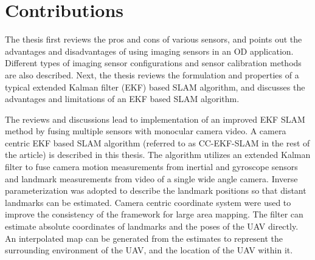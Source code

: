 \section{Contributions}\label{section:Contribution}
The thesis first reviews the pros and cons of various sensors, and
points out the advantages and disadvantages of using imaging sensors in
an OD application. Different types of imaging sensor configurations and
sensor calibration methods are also described. Next, the thesis
reviews the formulation and properties of a typical extended Kalman
filter (EKF) based SLAM algorithm, and discusses the advantages and
limitations of an EKF based SLAM algorithm.

The reviews and discussions lead to implementation of an improved EKF
SLAM method by fusing multiple sensors with monocular camera video.
A camera centric EKF based SLAM algorithm (referred to as CC-EKF-SLAM
in the rest of the article) is described in this thesis. The
algorithm utilizes an extended Kalman filter to fuse camera motion
measurements from inertial and gyroscope sensors and landmark
measurements from video of a single wide angle camera. Inverse
parameterization was adopted to describe the landmark positions so
that distant landmarks can be estimated. Camera centric coordinate system
were used to improve the consistency of the framework for large area
mapping. The filter can estimate absolute coordinates of landmarks and
the poses of the UAV directly. An interpolated map can be generated
from the estimates to represent the surrounding environment of the
UAV, and the location of the UAV within it.

